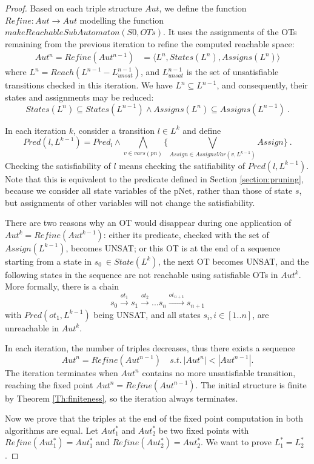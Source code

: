 \documentclass[smallcondensed]{svjour3}
\begin{document}
\begin{proof}
Based on each triple structure $Aut$, we define the function $Refine : Aut
\rightarrow Aut$ modelling the function $makeReachableSubAutomaton(S0,OTs)$. It
uses the assignments of the OTs remaining from the previous iteration
to refine the computed reachable space: 
\begin{align*}
Aut^n = Refine(Aut^{n-1}) &=\langle L^n, States(L^n), Assigns(L^n)\rangle
\end{align*}
where $L^n = Reach(L^{n-1} - L^{n-1}_{unsat})$, and $L^{n-1}_{unsat}$ is the
set of unsatisfiable transitions checked in this iteration. We have
$L^n\subseteq L^{n-1}$, and consequently, their states and assignments
may be reduced:
$$States(L^n)\subseteq States(L^{n-1}) \land Assigns(L^n)\subseteq
Assigns(L^{n-1})\ .$$

In each iteration $k$, consider a transition $l \in L^k$ and define 
\[Pred(l,L^{k-1}) = Pred_{l}\wedge \bigwedge_{v\in vars(pn)}\{ \bigvee_{Assign\in
  AssignsVar(v,L^{k-1})} Assign\}\ .\]
Checking the satisfiability of $l$ means checking the satifiability of
$Pred(l,L^{k-1})$.
Note that this is equivalent to the predicate defined in Section
\ref{section:pruning}, because we consider all state variables of the
pNet, rather than those of state $s$, but assignments
of other variables will not change the satisfiability.

There are two reasons why an OT would disappear during one application
of $Aut^k = Refine(Aut^{k-1})$: either its predicate, checked with the set of
$Assign(L^{k-1})$, becomes UNSAT; or this OT is at
the end of a sequence starting from a state in $s_0\ \in State(L^k)$,
the next OT becomes UNSAT, and the following states in the sequence are
not reachable using satisfiable OTs in $Aut^k$. More formally, there is a chain
\[s_0\xrightarrow{ot_1}s_1\xrightarrow{ot_2}...s_{n}\xrightarrow{ot_{n+1}}s_{n+1}\]
with $Pred(ot_1,L^{k-1})$ being UNSAT, and all states $s_i, i \in [1..n]$, are
unreachable in $Aut^k$.

\smallskip
In each iteration, the number of triples decreases, thus there
exists a sequence \[Aut^n = Refine(Aut^{n-1})\quad s.t. \ |Aut^n| <
|Aut^{n-1}|.\]
The iteration terminates when $Aut^n$ contains no more unsatisfiable
transition, reaching the fixed point $Aut^n = Refine(Aut^{n-1})$. The
initial structure is finite by Theorem \ref{Th:finiteness}, so the
iteration always terminates. 

\medskip
Now we prove that the triples at the end of the fixed point computation
in both algorithms are equal.
Let $Aut^*_1$ and $Aut^*_2$ be two fixed points with $Refine(Aut^*_1) =
Aut^*_1$ and $Refine(Aut^*_2) = Aut^*_2$.  
We want to prove $L_1^* = L_2^*$.


\end{proof}
\end{document}
